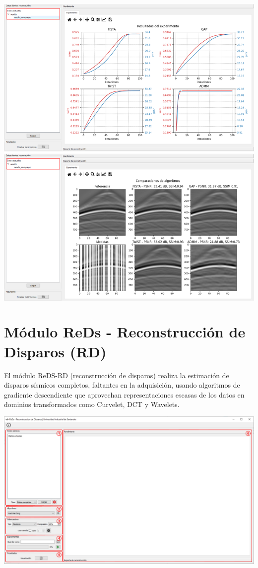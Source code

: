 \documentclass[12pt,twoside,letter]{ol-softwaremanual}
\newenvironment{Figure}
  {\par\medskip\noindent\minipage{\linewidth}}
  {\endminipage\par\medskip}
\begin{document}
\begin{Figure}
	\centering
	\includegraphics[width=1\linewidth]{report-6.png}
	\label{fig:report_6}
\end{Figure}

\cleardoublepage
\section{Módulo ReDs - Reconstrucción de Disparos (RD)}

El módulo ReDS-RD (reconstrucción de disparos) realiza la estimación de disparos sísmicos completos, faltantes en la adquisición, usando algoritmos de gradiente descendiente que aprovechan representaciones escasas de los datos en dominios transformados como Curvelet, DCT y Wavelets.

\begin{Figure}
	\centering
	\includegraphics[width=0.75\linewidth]{figures/rd}
	\label{fig:rd}
\end{Figure}
\end{document}
